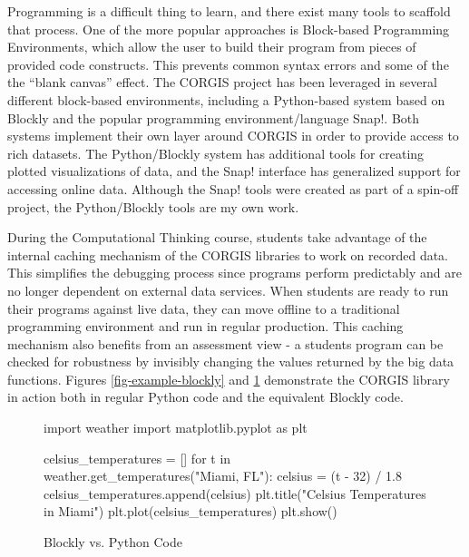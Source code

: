 Programming is a difficult thing to learn, and there exist many tools to scaffold that process.
One of the more popular approaches is Block-based Programming Environments, which allow the user to build their program from pieces of provided code constructs.
This prevents common syntax errors and some of the the ``blank canvas'' effect.
The CORGIS project has been leveraged in several different block-based environments, including a Python-based system based on Blockly and the popular programming environment/language Snap!. 
Both systems implement their own layer around CORGIS in order to provide access to rich datasets.
The Python/Blockly system has additional tools for creating plotted visualizations of data, and the Snap! interface has generalized support for accessing online data.
Although the Snap! tools were created as part of a spin-off project, the Python/Blockly tools are my own work.

During the Computational Thinking course, students take advantage of the internal caching mechanism of the CORGIS libraries to work on recorded data.
This simplifies the debugging process since programs perform predictably and are no longer dependent on external data services.
When students are ready to run their programs against live data, they can move offline to a traditional programming environment and run in regular production.
This caching mechanism also benefits from an assessment view - a students program can be checked for robustness by invisibly changing the values returned by the big data functions.
Figures \ref{fig-example-blockly} and \ref{fig-example-python} demonstrate the CORGIS library in action both in regular Python code and the equivalent Blockly code.

\begin{figure}
\label{fig-example-blockly}
\label{fig-example-python}
\caption{Blockly vs. Python Code}
\centering
\begin{minipage}[b]{.75\linewidth}
\end{minipage}

\smallskip

\begin{minipage}[b]{.75\linewidth}
\begin{python}
import weather
import matplotlib.pyplot as plt

celsius_temperatures = []
for t in weather.get_temperatures("Miami, FL"):
	celsius = (t - 32) / 1.8
	celsius_temperatures.append(celsius)
plt.title("Celsius Temperatures in Miami")
plt.plot(celsius_temperatures)
plt.show()
\end{python}
\end{minipage}
\end{figure}


